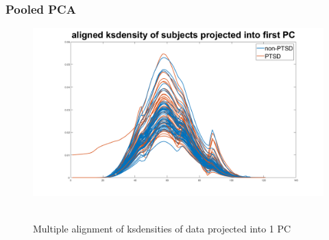 \documentclass{beamer}
\begin{document}
\begin{frame}
\frametitle{Pooled PCA}

    \begin{figure}[h!]
  \centering

    \includegraphics[width=.8\textwidth]{ksdensitiesDim1_aligned.png}\\~\\
    \caption{Multiple alignment of ksdensities of data projected into 1 PC}


  \label{fig:coffee1}
\end{figure}
\end{frame}
\end{document}
